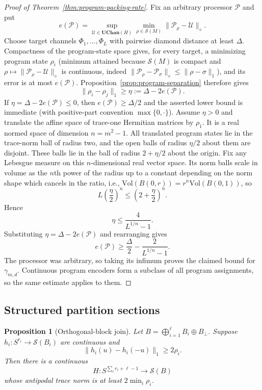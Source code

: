 \documentclass[11pt,a4paper]{article}
\theoremstyle{definition}
\theoremstyle{plain}
\newtheorem{proposition}[theorem]{Proposition}
\theoremstyle{remark}
\newcommand{\UChan}{\mathbf{UChan}}
\newcommand{\Sstate}{\mathcal{S}}
\begin{document}
\begin{proof}[Proof of Theorem~\ref{thm:program-packing-rate}]
Fix an arbitrary processor $\mathcal P$ and put
\[
e(\mathcal P)=
\sup_{\mathcal U\in\UChan(H)}
\min_{\rho\in\Sstate(M)}
\|\mathcal P_\rho-\mathcal U\|_\diamond.
\]
Choose target channels $\Phi_1,\ldots,\Phi_L$ with pairwise diamond distance
at least $\Delta$. Compactness of the program-state space gives, for every
target, a minimizing program state $\rho_i$ (minimum attained because $\Sstate(M)$ is compact and $\rho\mapsto\|\mathcal P_\rho-\mathcal U\|_\diamond$ is continuous, indeed $\|\mathcal P_\rho-\mathcal P_\sigma\|_\diamond\le\|\rho-\sigma\|_1$), and its error is at most
$e(\mathcal P)$. Proposition~\ref{prop:program-separation} therefore gives
\[
\|\rho_i-\rho_j\|_1\geq
\eta:=\Delta-2e(\mathcal P).
\]
If $\eta=\Delta-2e(\mathcal P)\leq0$, then
$e(\mathcal P)\geq\Delta/2$ and the asserted lower bound is immediate (with positive-part convention $\max\{0,\cdot\}$).
Assume $\eta>0$ and translate the affine space of trace-one Hermitian
matrices by $\rho_1$. It is a real
normed space of dimension $n=m^2-1$. All translated program states lie in
the trace-norm ball of radius two, and the open balls of radius $\eta/2$
about them are disjoint. These balls lie in the ball of radius
$2+\eta/2$ about the origin. Fix any Lebesgue measure on this
$n$-dimensional real vector space. Its norm balls scale in volume as the
$n$th power of the radius up to a constant depending on the norm shape which cancels in the ratio, i.e., $\mathrm{Vol}(B(0,r))=r^n\mathrm{Vol}(B(0,1))$, so
\[
L\left(\frac\eta2\right)^n
\leq\left(2+\frac\eta2\right)^n.
\]
Hence
\[
\eta\leq\frac4{L^{1/n}-1}.
\]
Substituting $\eta=\Delta-2e(\mathcal P)$ and rearranging gives
\[
e(\mathcal P)\geq
\frac\Delta2-\frac2{L^{1/n}-1}.
\]
The processor was arbitrary, so taking its infimum proves the claimed bound
for $\gamma_{m,d}$. Continuous program encoders form a subclass of all
program assignments, so the same estimate applies to them.
\end{proof}

\subsection{Structured partition sections}
\label{app:partition-sections}

\begin{proposition}[Orthogonal-block join]
\label{prop:join}
Let $B=\bigoplus_{i=1}^{\ell}B_i\oplus B_\perp$. Suppose
$h_i:S^{r_i}\to\Sstate(B_i)$ are continuous and
\[
\|h_i(u)-h_i(-u)\|_1\geq2\rho_i.
\]
Then there is a continuous
\[
H:S^{\sum_i r_i+\ell-1}\to\Sstate(B)
\]
whose antipodal trace norm is at least
$2\min_i\rho_i$.
\end{proposition}
\end{document}
